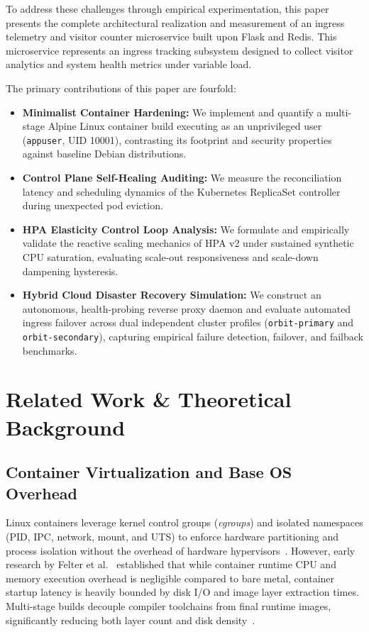 \documentclass[conference]{IEEEtran}
\begin{document}
To address these challenges through empirical experimentation, this paper presents the complete architectural realization and measurement of an ingress telemetry and visitor counter microservice built upon Flask and Redis. This microservice represents an ingress tracking subsystem designed to collect visitor analytics and system health metrics under variable load.

The primary contributions of this paper are fourfold:
\begin{itemize}
    \item \textbf{Minimalist Container Hardening:} We implement and quantify a multi-stage Alpine Linux container build executing as an unprivileged user (\texttt{appuser}, UID 10001), contrasting its footprint and security properties against baseline Debian distributions.
    \item \textbf{Control Plane Self-Healing Auditing:} We measure the reconciliation latency and scheduling dynamics of the Kubernetes ReplicaSet controller during unexpected pod eviction.
    \item \textbf{HPA Elasticity Control Loop Analysis:} We formulate and empirically validate the reactive scaling mechanics of HPA v2 under sustained synthetic CPU saturation, evaluating scale-out responsiveness and scale-down dampening hysteresis.
    \item \textbf{Hybrid Cloud Disaster Recovery Simulation:} We construct an autonomous, health-probing reverse proxy daemon and evaluate automated ingress failover across dual independent cluster profiles (\texttt{orbit-primary} and \texttt{orbit-secondary}), capturing empirical failure detection, failover, and failback benchmarks.
\end{itemize}

\section{Related Work \& Theoretical Background}

\subsection{Container Virtualization and Base OS Overhead}
Linux containers leverage kernel control groups (\textit{cgroups}) and isolated namespaces (PID, IPC, network, mount, and UTS) to enforce hardware partitioning and process isolation without the overhead of hardware hypervisors~\cite{burns2016}. However, early research by Felter et al.~\cite{felter2015} established that while container runtime CPU and memory execution overhead is negligible compared to bare metal, container startup latency is heavily bounded by disk I/O and image layer extraction times. Multi-stage builds decouple compiler toolchains from final runtime images, significantly reducing both layer count and disk density~\cite{dockerbuild}.
\end{document}
